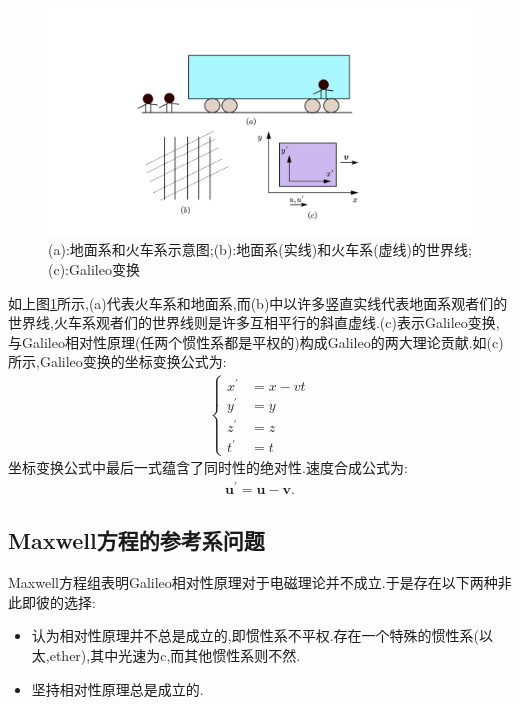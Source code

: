 \begin{figure}[htbp]
    \centering
 \includegraphics[width=1.2\textwidth]{Pictures/6-2.png}
    \caption{(a):地面系和火车系示意图;(b):地面系(实线)和火车系(虚线)的世界线;(c):Galileo变换}
    \label{fig:6-2}
\end{figure}

如上图\ref{fig:6-2}所示,(a)代表火车系和地面系,而(b)中以许多竖直实线代表地面系观者们的世界线,火车系观者们的世界线则是许多互相平行的斜直虚线.(c)表示Galileo变换,与Galileo相对性原理(任两个惯性系都是平权的)构成Galileo的两大理论贡献.如(c)所示,Galileo变换的坐标变换公式为:
\begin{align}
    \left\{
    \begin{aligned}
        x^\prime&=x-vt\\
        y^\prime&=y\\
        z^\prime&=z\\
        t^\prime&=t
    \end{aligned}
    \right.
\end{align}
坐标变换公式中最后一式蕴含了同时性的绝对性.速度合成公式为:
\begin{align}
    \boldsymbol{u}^\prime=\boldsymbol{u}-\boldsymbol{v}.
\end{align}
\subsection{Maxwell方程的参考系问题}
Maxwell方程组表明Galileo相对性原理对于电磁理论并不成立.于是存在以下两种非此即彼的选择:
\begin{itemize}
\item 认为相对性原理并不总是成立的,即惯性系不平权.存在一个特殊的惯性系(以太,ether),其中光速为c,而其他惯性系则不然.
\item 坚持相对性原理总是成立的.
\end{itemize}

